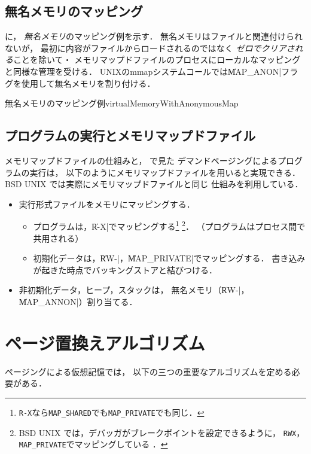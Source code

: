 \subsection{無名メモリのマッピング}
に，
\emph{無名メモリ}のマッピング例を示す．
無名メモリはファイルと関連付けられないが，
最初に内容がファイルからロードされるのではなく
\emph{ゼロでクリアされる}ことを除いて・
メモリマップドファイルのプロセスにローカルなマッピングと同様な管理を受ける．
UNIXのmmapシステムコールでは\|MAP_ANON|フラグを使用して無名メモリを割り付ける．

         {無名メモリのマッピング例}{virtualMemoryWithAnonymousMap}

\subsection{プログラムの実行とメモリマップドファイル}
メモリマップドファイルの仕組みと，
で見た
デマンドページングによるプログラムの実行は，
以下のようにメモリマップドファイルを用いると実現できる．
BSD UNIX では実際にメモリマップドファイルと同じ
仕組みを利用している\cite{execOfFreeBSD}．

\begin{itemize}
\item 実行形式ファイルをメモリにマッピングする．
  \begin{itemize}
  \item プログラムは，\|R-X|でマッピングする\footnote{
    \texttt{R-X}なら\texttt{MAP\_SHARED}でも\texttt{MAP\_PRIVATE}でも同じ．}
    \footnote{
      BSD UNIX では，デバッガがブレークポイントを設定できるように，
      \texttt{RWX}，\texttt{MAP\_PRIVATE}でマッピングしている
      \cite{execOfFreeBSD}．}．
         （プログラムはプロセス間で共用される）
  \item 初期化データは，\|RW-|，\|MAP_PRIVATE|でマッピングする．
    書き込みが起きた時点でバッキングストアと結びつける．
  \end{itemize}
\item 非初期化データ，ヒープ，スタックは，
  無名メモリ（\|RW-|，\|MAP_ANNON|）割り当てる．
\end{itemize}

\section{ページ置換えアルゴリズム}
ページングによる仮想記憶では，
以下の三つの重要なアルゴリズムを定める必要がある．

